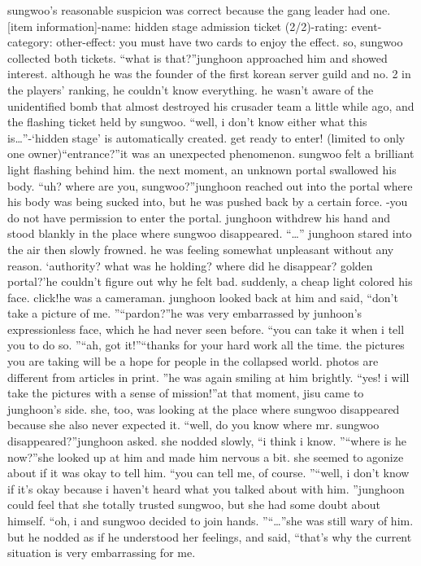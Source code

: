 sungwoo’s reasonable suspicion was correct because the gang leader had one.
[item information]-name: hidden stage admission ticket (2/2)-rating: event-category: other-effect: you must have two cards to enjoy the effect.
so, sungwoo collected both tickets.
“what is that?”junghoon approached him and showed interest.
 although he was the founder of the first korean server guild and no.
 2 in the players’ ranking, he couldn’t know everything.
he wasn’t aware of the unidentified bomb that almost destroyed his crusader team a little while ago, and the flashing ticket held by sungwoo.
“well, i don’t know either what this is…”-‘hidden stage’ is automatically created.
 get ready to enter! (limited to only one owner)“entrance?”it was an unexpected phenomenon.
 sungwoo felt a brilliant light flashing behind him.
 the next moment, an unknown portal swallowed his body.
“uh? where are you, sungwoo?”junghoon reached out into the portal where his body was being sucked into, but he was pushed back by a certain force.
-you do not have permission to enter the portal.
junghoon withdrew his hand and stood blankly in the place where sungwoo disappeared.
“…”
junghoon stared into the air then slowly frowned.
 he was feeling somewhat unpleasant without any reason.
‘authority? what was he holding? where did he disappear? golden portal?’he couldn’t figure out why he felt bad.
 suddenly, a cheap light colored his face.
click!he was a cameraman.
 junghoon looked back at him and said, “don’t take a picture of me.
”“pardon?”he was very embarrassed by junhoon’s expressionless face, which he had never seen before.
“you can take it when i tell you to do so.
”“ah, got it!”“thanks for your hard work all the time.
 the pictures you are taking will be a hope for people in the collapsed world.
 photos are different from articles in print.
”he was again smiling at him brightly.
“yes! i will take the pictures with a sense of mission!”at that moment, jisu came to junghoon’s side.
 she, too, was looking at the place where sungwoo disappeared because she also never expected it.
“well, do you know where mr.
 sungwoo disappeared?”junghoon asked.
she nodded slowly, “i think i know.
”“where is he now?”she looked up at him and made him nervous a bit.
 she seemed to agonize about if it was okay to tell him.
“you can tell me, of course.
”“well, i don’t know if it’s okay because i haven’t heard what you talked about with him.
”junghoon could feel that she totally trusted sungwoo, but she had some doubt about himself.
“oh, i and sungwoo decided to join hands.
”“…”she was still wary of him.
but he nodded as if he understood her feelings, and said, “that’s why the current situation is very embarrassing for me.
